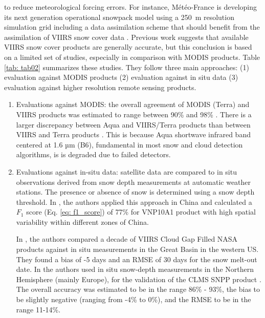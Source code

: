 \documentclass[tc, manuscript]{copernicus}
\begin{document}
to reduce meteorological forcing errors. For instance, Météo-France is developing its next generation operational snowpack model using a 250~m resolution simulation grid including a data assimilation scheme that should benefit from the assimilation of VIIRS snow cover data \citep{lafaysse_modelisation_2023}.  Previous work suggests that available VIIRS snow cover products are generally accurate, but this conclusion is based on a limited set of studies, especially in comparison with MODIS products. Table \ref{tab: tab02} summarizes these studies. They follow three main approaches: (1) evaluation against MODIS products (2) evaluation against in situ data (3) evaluation against higher resolution remote sensing products. 

\begin{enumerate}

    \item Evaluations against MODIS: the overall agreement of MODIS (Terra) and VIIRS products was estimated to range between 90\% and 98\% \citep{riggs2023viirs, thapa_cross-comparison_2019}. There is a larger discrepancy between Aqua and VIIRS/Terra products than between VIIRS and Terra products \citep{zhang_comparative_2020}. This is because Aqua shortwave infrared band centered at 1.6 µm (B6), fundamental in most snow and cloud detection algorithms, is is degraded due to failed detectors.
  
    \item Evaluations against in-situ data: satellite data are compared to in situ observations derived from snow depth measurements at automatic weather stations. The presence or absence of snow is determined using a snow depth threshold. In \citep{zhang_comparative_2020}, the authors applied this approach in China and calculated a $F_1$ score (Eq. \ref{eq: f1_score}) of 77\% for VNP10A1 product with high spatial variability within different zones of China.
    
    In \citep{hall_comparison_2024}, the authors compared a decade of VIIRS Cloud Gap Filled NASA products against in situ measurements in the Great Basin in the western US. They found a bias of -5 days and an RMSE of 30 days for the snow melt-out date. In \citep{schwaizer2020SnowCoverExtentb} the authors used in situ snow-depth measurements in the Northern Hemisphere (mainly Europe), for the validation of the CLMS SNPP product \citep{europeanunionscopernicuslandmonitoringserviceinformationSnowCoverExtent}. 
    The overall accuracy was estimated to be in the range 86\% - 93\%, the bias to be slightly negative (ranging from -4\% to 0\%), and the RMSE to be in the range 11-14\%.
    

\end{enumerate}
\end{document}
